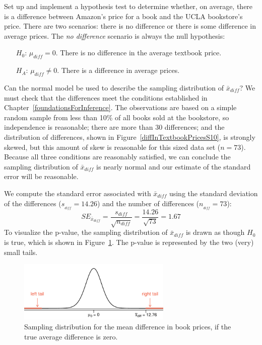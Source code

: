 \begin{example}{Set up and implement a hypothesis test to determine whether, on average, there is a difference between Amazon's price for a book and the UCLA bookstore's price.}
\label{htForDiffInUCLAAndAmazonTextbookPrices}
There are two scenarios: there is no difference or there is some difference in average prices. The \emph{no difference} scenario is always the null hypothesis:
\begin{itemize}
\setlength{\itemsep}{0mm}
\item[$H_0$:] $\mu_{diff}=0$. There is no difference in the average textbook price.
\item[$H_A$:] $\mu_{diff} \neq 0$. There is a difference in average prices.
\end{itemize}
Can the normal model be used to describe the sampling distribution of $\bar{x}_{diff}$? We must check that the differences meet the conditions established in Chapter~\ref{foundationsForInference}. The observations are based on a simple random sample from less than 10\% of all books sold at the bookstore, so independence is reasonable; there are more than 30 differences; and the distribution of differences, shown in Figure~\ref{diffInTextbookPricesS10}, is strongly skewed, but this amount of skew is reasonable for this sized data set ($n=73$). Because all three conditions are reasonably satisfied, we can conclude the sampling distribution of $\bar{x}_{diff}$ is nearly normal and our estimate of the standard error will be reasonable.

We compute the standard error associated with $\bar{x}_{diff}$ using the standard deviation of the differences ($s_{_{diff}}=14.26$) and the number of differences ($n_{_{diff}}=73$):
$$SE_{\bar{x}_{diff}} = \frac{s_{diff}}{\sqrt{n_{diff}}} = \frac{14.26}{\sqrt{73}} = 1.67$$
To visualize the p-value, the sampling distribution of $\bar{x}_{diff}$ is drawn as though $H_0$ is true, which is shown in Figure~\ref{textbooksS10HTTails}. The p-value is represented by the two (very) small tails.

\begin{figure}
\centering
\includegraphics[width=0.65\textwidth]{05/figures/textbooksS10/textbooksS10HTTails}
\caption{Sampling distribution for the mean difference in book prices, if the true average difference is zero.}
\label{textbooksS10HTTails}
\end{figure}


\end{example}
